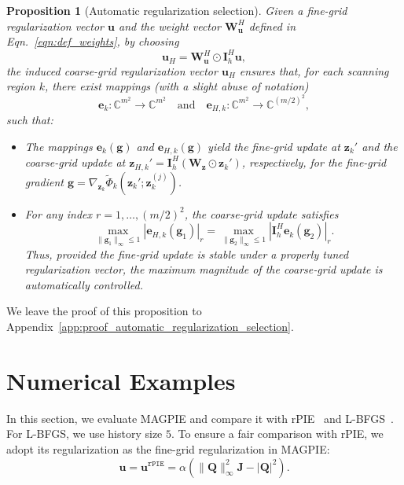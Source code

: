 \documentclass{article}
\numberwithin{equation}{section}
\newtheorem{proposition}[theorem]{Proposition}
\begin{document}
\begin{proposition}[Automatic regularization selection]\label{prop:automatic_regularization_selection}
Given a fine-grid regularization vector $\bm{u}$ and the weight vector $\bm{W}_{\bm{u}}^H$ defined in~ Eqn.~\eqref{eqn:def_weights}, by choosing
\begin{equation*}
    \bm{u}_H = \bm{W}_{\bm{u}}^H\odot \bm{I}_h^H\bm{u},
\end{equation*}
the induced coarse-grid regularization vector $\bm{u}_H$ ensures that, for each scanning region $k$, there exist mappings (with a slight abuse of notation)
\begin{equation*}
    \bm{e}_k:\mathbb{C}^{m^2}\to\mathbb{C}^{m^2}
    \quad\text{and}\quad
    \bm{e}_{H,k}:\mathbb{C}^{m^2}\to\mathbb{C}^{(m/2)^2},
\end{equation*}
such that:
\begin{itemize}
    \item The mappings $\bm{e}_k(\bm{g})$ and $\bm{e}_{H,k}(\bm{g})$ yield the fine-grid update at $\bm{z}_k'$ and the coarse-grid update at $\bm{z}_{H,k}' = \bm{I}_h^H(\bm{W}_{\bm{z}}\odot\bm{z}_k')$, respectively, for the fine-grid gradient $\bm{g} = \nabla_{\bm{z}_k}\widetilde{\Phi}_k(\bm{z}_k';\bm{z}_k^{(j)})$.
    
    \item For any index $r=1,\dots,(m/2)^2$, the coarse-grid update satisfies
    \begin{equation*}
        \max_{\|\bm{g}_1\|_\infty\le1}\left|\bm{e}_{H,k}(\bm{g}_1)\right|_r = \max_{\|\bm{g}_2\|_\infty\le1}\left|\bm{I}_h^H\bm{e}_k(\bm{g}_2)\right|_r. 
    \end{equation*}
    Thus, provided the fine‐grid update is stable under a properly tuned regularization vector, the maximum magnitude of the coarse‐grid update is automatically controlled.
\end{itemize}
\end{proposition}
We leave the proof of this proposition to Appendix~\ref{app:proof_automatic_regularization_selection}. 

\section{Numerical Examples}\label{sec:numerical_examples}
In this section, we evaluate MAGPIE and compare it with rPIE~\cite{rPIE} and L-BFGS~\cite{LBFGS}. For L-BFGS, we use history size $5$. To ensure a fair comparison with rPIE, we adopt its regularization as the fine-grid regularization in MAGPIE:
\begin{equation*}
  \bm{u}
  = \bm{u}^{\texttt{rPIE}}
  = \alpha\left(\|\bm{Q}\|_{\infty}^2\bm{J} - |\bm{Q}|^2\right).
\end{equation*}
\end{document}

